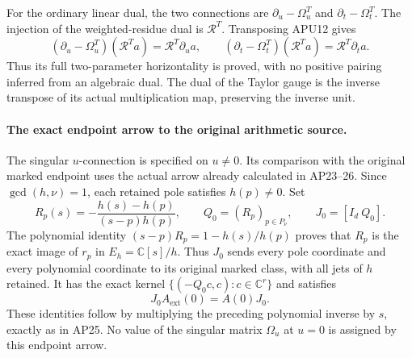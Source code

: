 For the ordinary linear dual, the two connections are
\(\partial_u-\Omega_u^T\) and
\(\partial_t-\Omega_t^T\).
The injection of the weighted-residue dual is
\(\mathcal R^T\).  Transposing APU12 gives
\[
 (\partial_u-\Omega_u^T)(\mathcal R^T a)
       =\mathcal R^T\partial_u a,\qquad
 (\partial_t-\Omega_t^T)(\mathcal R^T a)
       =\mathcal R^T\partial_t a .
 \tag{APU17}
\]
Thus its full two-parameter horizontality is proved, with no
positive pairing inferred from an algebraic dual.
The dual of the Taylor gauge is the inverse transpose of its
actual multiplication map, preserving the inverse unit.

\paragraph{The exact endpoint arrow to the original arithmetic source.}
The singular \(u\)-connection is specified on \(u\ne0\).
Its comparison with the original marked endpoint uses the actual
arrow already calculated in AP23--26.  Since
\(\gcd(h,\nu)=1\), each retained pole satisfies \(h(p)\ne0\).
Set
\[
 R_p(s)=-\frac{h(s)-h(p)}{(s-p)h(p)},\qquad
 Q_0=(R_p)_{p\in P_\nu},\qquad J_0=[I_d\ Q_0].
 \tag{APU18}
\]
The polynomial identity
\((s-p)R_p=1-h(s)/h(p)\) proves that \(R_p\) is the exact
image of \(r_p\) in \(E_h=\mathbb C[s]/h\).
Thus \(J_0\) sends every pole coordinate and every polynomial
coordinate to its original marked class, with all jets of \(h\)
retained.  It has the exact kernel
\(\{(-Q_0c,c):c\in\mathbb C^r\}\) and satisfies
\[
 J_0A_{\mathrm{ext}}(0)=A(0)J_0.
 \tag{APU19}
\]
These identities follow by multiplying the preceding polynomial
inverse by \(s\), exactly as in AP25.  No value of the singular
matrix \(\Omega_u\) at \(u=0\) is assigned by this endpoint arrow.

